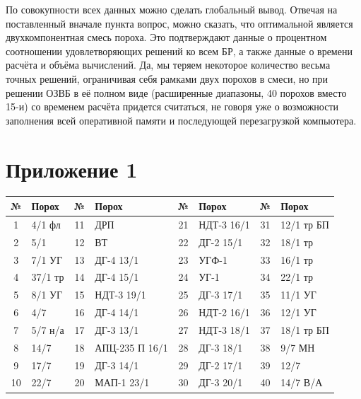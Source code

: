 \documentclass[14pt, a4paper]{extreport} %
\begin{document}
По совокупности всех данных можно сделать глобальный вывод. Отвечая на поставленный вначале пункта вопрос, можно сказать, что оптимальной является двухкомпонентная смесь пороха. Это подтверждают данные о процентном соотношении удовлетворяющих решений ко всем БР, а также данные 
о времени расчёта и объёма вычислений. Да, мы теряем некоторое количество весьма точных решений, ограничивая себя рамками двух порохов в смеси, но при решении ОЗВБ в её полном виде (расширенные диапазоны, 40 порохов вместо 15-и) со временем расчёта придется считаться, не говоря уже о возможности 
заполнения всей оперативной памяти и последующей перезагрузкой компьютера.

\chapter*{Приложение 1}

\begin{table}[h]
\centering
\begin{tabular}{|c|l|c|l|c|l|c|l|}
\hline
\textbf{№} & \textbf{Порох} & \textbf{№} & \textbf{Порох} & \textbf{№} & \textbf{Порох} & \textbf{№} & \textbf{Порох} \\
\hline
1 & 4/1 фл & 11 & ДРП & 21 & НДТ-3 16/1 & 31 & 12/1 тр БП \\
\hline
2 & 5/1 & 12 & ВТ & 22 & ДГ-2 15/1 & 32 & 18/1 тр \\
\hline
3 & 7/1 УГ & 13 & ДГ-4 13/1 & 23 & УГФ-1 & 33 & 16/1 тр \\
\hline
4 & 37/1 тр & 14 & ДГ-4 15/1 & 24 & УГ-1 & 34 & 22/1 тр \\
\hline
5 & 8/1 УГ & 15 & НДТ-3 19/1 & 25 & ДГ-3 17/1 & 35 & 11/1 УГ \\
\hline
6 & 4/7 & 16 & ДГ-4 14/1 & 26 & НДТ-2 16/1 & 36 & 12/1 УГ \\
\hline
7 & 5/7 н/а & 17 & ДГ-3 13/1 & 27 & НДТ-3 18/1 & 37 & 18/1 тр БП \\
\hline
8 & 14/7 & 18 & АПЦ-235 П 16/1 & 28 & ДГ-3 18/1 & 38 & 9/7 МН \\
\hline
9 & 17/7 & 19 & ДГ-3 14/1 & 29 & ДГ-2 17/1 & 39 & 12/7 \\
\hline
10 & 22/7 & 20 & МАП-1 23/1 & 30 & ДГ-3 20/1 & 40 & 14/7 В/А \\
\hline
\end{tabular}
\end{table}
\end{document}
